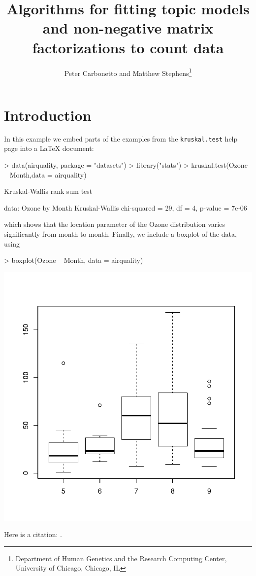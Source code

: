 \documentclass[final]{siamart171218}
\title{Algorithms for fitting topic models and non-negative matrix factorizations to count data}
\author{Peter Carbonetto and Matthew Stephens\thanks{Department of Human Genetics and the Research Computing Center, University of Chicago, Chicago, IL}}
\begin{document}
\maketitle

\section{Introduction}

In this example we embed parts of the examples from the
\texttt{kruskal.test} help page into a \LaTeX{} document:
\begin{Schunk}
\begin{Sinput}
> data(airquality, package = "datasets")
> library("stats")
> kruskal.test(Ozone ~ Month,data = airquality)
\end{Sinput}
\begin{Soutput}
	Kruskal-Wallis rank sum test

data:  Ozone by Month
Kruskal-Wallis chi-squared = 29, df = 4, p-value = 7e-06
\end{Soutput}
\end{Schunk}

which shows that the location parameter of the Ozone distribution
varies significantly from month to month. Finally, we include a
boxplot of the data, using
\begin{Schunk}
\begin{Sinput}
> boxplot(Ozone ~ Month, data = airquality)
\end{Sinput}
\end{Schunk}
\begin{center} 
\includegraphics{algorithms-003}
\end{center}

Here is a citation: \cite{lee-2001}.



\end{document}

